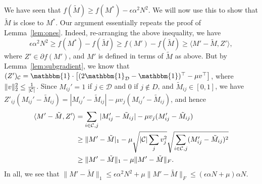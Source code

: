 \documentclass[11pt]{article}
\newcommand{\M}{\tilde{M}}
\newcommand{\sD}{\mathcal{D}}
\newcommand{\bi}{\mathbbm{1}}
\begin{document}
We have seen that $f(\M) \geq f(M^*) - \epsilon \alpha^2 N^2$. We will now 
use this to show that $\M$ is close to $M^*$. Our argument essentially repeats 
the proof of Lemma~\ref{lem:ones}. Indeed, re-arranging the above 
inequality, we have
\[ \epsilon \alpha^2 N^2 \geq f(M^*) - f(\M) \geq f(M') - f(\M) \geq \langle M' - \M, Z' \rangle, \]
where $Z' \in \partial f(M')$, and $M'$ is defined in terms of $\M$ as above. 
But by Lemma~\ref{lem:subgradient}, we know that $(Z')_{\sC} = \bi \cdot \left[(2\bi_{\sD}-\bi)^{\top} - \mu v^{\top}\right]$, 
where $\|v\|_2^2 \leq \frac{1}{|\mathcal{C}|}$. Since $M_{ij}' = 1$ if $j \in \sD$ and $0$ if $j \not\in D$, and 
$\M_{ij} \in [0,1]$, we have $Z'_{ij}(M_{ij}'-\M_{ij}) = |M_{ij}' - \M_{ij}| - \mu v_j(M_{ij}'-\M_{ij})$, and hence
\begin{align}
\langle M' - \M, Z' \rangle &= \sum_{i \in \sC, j} |M_{ij}' - \M_{ij}| - \mu v_j (M_{ij}' - \M_{ij}) \\
 &\geq \|M'-\M|_1 - \mu \sqrt{|\sC|\sum_j v_j^2}\sqrt{\sum_{i \in \sC, j} (M_{ij}'-\M_{ij})^2} \\
 &\geq \|M'-\M\|_1 - \mu \|M' - \M\|_F.
\end{align}
In all, we see that $\|M'-\M\|_1 \leq \epsilon \alpha^2 N^2 + \mu \|M' - \M\|_F \leq (\epsilon\alpha N + \mu)\alpha N$.
\end{document}
